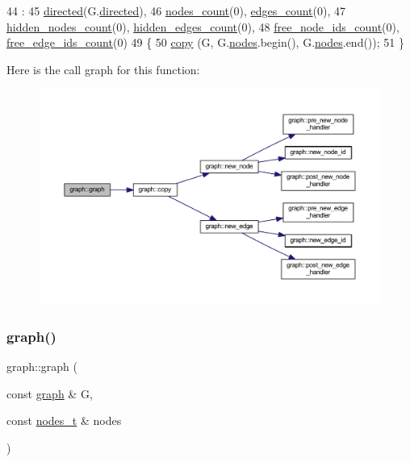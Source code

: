 \begin{DoxyCode}
44                            :
45     \mbox{\hyperlink{classgraph_ab4120df210eb3d03d20b0bd27f8cbe8c}{directed}}(G.\mbox{\hyperlink{classgraph_ab4120df210eb3d03d20b0bd27f8cbe8c}{directed}}),
46     \mbox{\hyperlink{classgraph_a1f59223d0bcf647920963d7a661dd74a}{nodes\_count}}(0), \mbox{\hyperlink{classgraph_af560ff4263ad165c166a46084e781b4a}{edges\_count}}(0),
47     \mbox{\hyperlink{classgraph_aa72548d972d226a69f7f8fb92b363860}{hidden\_nodes\_count}}(0), \mbox{\hyperlink{classgraph_a3151f544e049fbd985204ca9d8f74c97}{hidden\_edges\_count}}(0),
48     \mbox{\hyperlink{classgraph_a9480e2310fe64c3a8ad295bb3f119772}{free\_node\_ids\_count}}(0), \mbox{\hyperlink{classgraph_a336be547b5e0ca43b96cf00131e0e1da}{free\_edge\_ids\_count}}(0)
49 \{
50     \mbox{\hyperlink{classgraph_abc39d65a6ca3f3165bc71c7125dfd22e}{copy}} (G, G.\mbox{\hyperlink{classgraph_a4ea0592e8eb7c26c5abad24546907726}{nodes}}.begin(), G.\mbox{\hyperlink{classgraph_a4ea0592e8eb7c26c5abad24546907726}{nodes}}.end());
51 \}
\end{DoxyCode}
Here is the call graph for this function\+:\nopagebreak
\begin{figure}[H]
\begin{center}
\leavevmode
\includegraphics[width=350pt]{classgraph_a4339b04667a9977110e59a1326b0e2d5_cgraph}
\end{center}
\end{figure}
\mbox{\label{classgraph_a05af875b45eb2534f06a42dd1a6783c6}} 
\subsubsection{\texorpdfstring{graph()}{graph()}\hspace{0.1cm}{\footnotesize\ttfamily [3/4]}}
{\footnotesize\ttfamily graph\+::graph (\begin{DoxyParamCaption}\item[{const \mbox{\hyperlink{classgraph}{graph}} \&}]{G,  }\item[{const \mbox{\hyperlink{edge_8h_a22ac17689106ba21a84e7bc54d1199d6}{nodes\+\_\+t}} \&}]{nodes }\end{DoxyParamCaption})}

